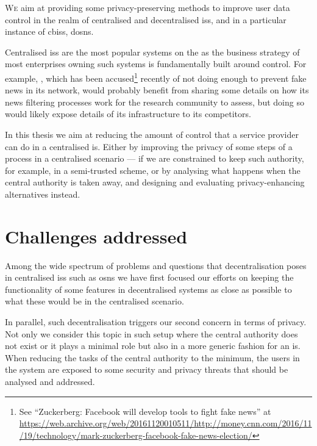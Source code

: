 

\lettrine{\textcolor[gray]{.25}{W}}{e} aim at providing some privacy-preserving 
methods to improve user data control in the realm of centralised and decentralised 
\acp{is}, and in a particular instance of \acp{cbis}, \acp{dosn}.

Centralised \acp{is} are the most popular systems on the \Internet as the business 
strategy of most enterprises owning such systems is fundamentally built around control. 
For example, \Facebook, which has been accused\footnote{See ``Zuckerberg: Facebook will develop tools to fight fake news'' at \url{https://web.archive.org/web/20161120010511/http://money.cnn.com/2016/11/19/technology/mark-zuckerberg-facebook-fake-news-election/}} 
recently of not doing enough to prevent fake news in its network, would probably 
benefit from sharing some details on how its news filtering processes work for the 
research community to assess, but doing so would likely expose details of its infrastructure 
to its competitors.

In this thesis we aim at reducing the amount of control that a service provider 
can do in a centralised \ac{is}. Either by improving the privacy of some steps of 
a process in a centralised scenario --- if we are constrained to keep such authority, 
for example, in a semi-trusted scheme, or by analysing what happens when the central 
authority is taken away, and designing and evaluating privacy-enhancing alternatives 
instead.

\section{Challenges addressed}
    \label{section:thesis:challenges-addressed}
Among the wide spectrum of problems and questions that decentralisation poses in 
centralised \acp{is} such as \acp{osn} we have first focused our efforts on keeping 
the functionality of some features in decentralised systems as close as possible 
to what these would be in the centralised scenario.

In parallel, such decentralisation triggers our second concern in terms of privacy.
Not only we consider this topic in such setup where the central authority does not 
exist or it plays a minimal role but also in a more generic fashion for an \ac{is}. 
When reducing the tasks of the central authority to the minimum, the users in the 
system are exposed to some security and privacy threats that should be analysed 
and addressed.

